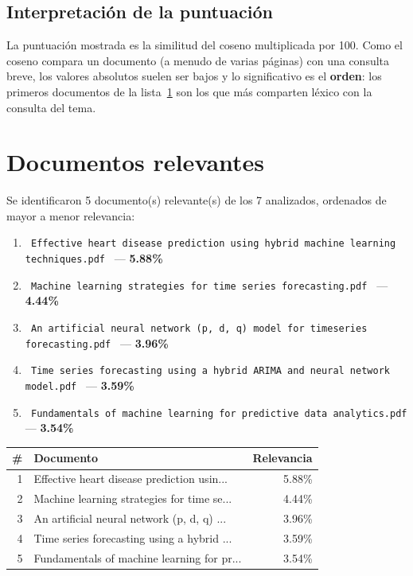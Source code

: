 \documentclass[11pt,a4paper]{article}
\newcommand{\nombrearchivo}[1]{\texttt{#1}}
\newcommand{\pcento}{\%}
\begin{document}
\subsection{Interpretación de la puntuación}

La puntuación mostrada es la similitud del coseno multiplicada por 100. Como
el coseno compara un documento (a menudo de varias páginas) con una consulta
breve, los valores absolutos suelen ser bajos y lo significativo es el
\textbf{orden}: los primeros documentos de la lista~\ref{sec:relevantes} son
los que más comparten léxico con la consulta del tema.

\section{Documentos relevantes}
\label{sec:relevantes}

Se identificaron 5 documento(s) relevante(s) de los
7 analizados, ordenados de mayor a menor relevancia:

\begin{enumerate}
\setlength{\itemsep}{6pt}
\renewcommand{\labelenumi}{\arabic{enumi}.}
  \item \nombrearchivo{ Effective heart disease prediction using hybrid machine learning techniques.pdf } --- \textbf{ 5.88\pcento}
  \item \nombrearchivo{ Machine learning strategies for time series forecasting.pdf } --- \textbf{ 4.44\pcento}
  \item \nombrearchivo{ An artificial neural network (p, d, q) model for timeseries forecasting.pdf } --- \textbf{ 3.96\pcento}
  \item \nombrearchivo{ Time series forecasting using a hybrid ARIMA and neural network model.pdf } --- \textbf{ 3.59\pcento}
  \item \nombrearchivo{ Fundamentals of machine learning for predictive data analytics.pdf } --- \textbf{ 3.54\pcento}
\end{enumerate}

\begin{center}
\begin{tabular}{r p{8.5cm} r}
\hline
\textbf{\#} & \textbf{Documento} & \textbf{Relevancia} \\
\hline
1 & Effective heart disease prediction usin... & 5.88\pcento \\
2 & Machine learning strategies for time se... & 4.44\pcento \\
3 & An artificial neural network (p, d, q) ... & 3.96\pcento \\
4 & Time series forecasting using a hybrid ... & 3.59\pcento \\
5 & Fundamentals of machine learning for pr... & 3.54\pcento \\
\hline
\end{tabular}
\end{center}
\end{document}
